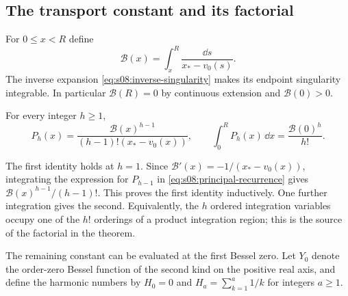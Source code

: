 \subsection{The transport constant and its factorial}
\label{subsec:s08:03}

For $0\leq x<R$ define
\begin{equation}\label{eq:s08:transport-integral}
 \mathcal B(x)=\int_x^R\frac{\dd s}{x_*-v_0(s)}.
\end{equation}
The inverse expansion \eqref{eq:s08:inverse-singularity} makes its
endpoint singularity integrable. In particular $\mathcal B(R)=0$
by continuous extension and $\mathcal B(0)>0$.

\begin{lmm}\label{lmm:s08:ordered-integrals}
For every integer $h\geq1$,
\begin{equation}\label{eq:s08:ordered-integrals}
 P_h(x)=\frac{\mathcal B(x)^{h-1}}
                      {(h-1)!(x_*-v_0(x))},\qquad
 \int_0^R P_h(x)\,\dd x=\frac{\mathcal B(0)^h}{h!}.
\end{equation}
\end{lmm}
\begin{prf}
The first identity holds at $h=1$. Since
$\mathcal B'(x)=-1/(x_*-v_0(x))$, integrating the expression for
$P_{h-1}$ in \eqref{eq:s08:principal-recurrence} gives
$\mathcal B(x)^{h-1}/(h-1)!$. This proves the first identity
inductively. One further integration gives the second. Equivalently,
the $h$ ordered integration variables occupy one of the $h!$
orderings of a product integration region; this is the source of
the factorial in the theorem.
\end{prf}

The remaining constant can be evaluated at the first Bessel zero.
Let $Y_0$ denote the order-zero Bessel function of the second kind
on the positive real axis, and define the harmonic numbers by
$H_0=0$ and $H_a=\sum_{k=1}^a1/k$ for integers $a\geq1$.

